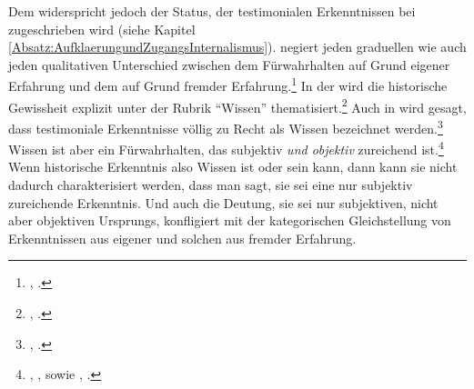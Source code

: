 Dem widerspricht jedoch der Status, der testimonialen Erkenntnissen bei
 zugeschrieben wird (siehe Kapitel
\ref{Absatz:AufklaerungundZugangsInternalismus}). 
negiert jeden graduellen wie auch jeden qualitativen Unterschied zwischen dem
Fürwahrhalten auf Grund eigener Erfahrung und dem auf Grund fremder
Erfahrung.\footnote{\cite[Vgl.][A 103]{Kant:ImmanuelKantsLogik1977}, \cite[][IX:
69.2--4]{Kant:GesammelteWerke1900ff.}.} In der 
wird die historische Gewissheit explizit unter der Rubrik \enquote{Wissen}
thematisiert.\footnote{\cite[Vgl.][A 108]{Kant:ImmanuelKantsLogik1977},
\cite[][IX: 71.6--7]{Kant:GesammelteWerke1900ff.}.} Auch in  wird gesagt, dass testimoniale Erkenntnisse völlig
zu Recht als Wissen bezeichnet werden.\footnote{\cite[Vgl.][A
319]{Kant:Washeisst:SichimDenkenorientieren?1977},
\cite[][VIII: 141.10--17]{Kant:GesammelteWerke1900ff.}.} Wissen ist aber ein
Fürwahrhalten, das subjektiv \emph{und objektiv} zureichend
ist.\footnote{\cite[Vgl.][B 850]{Kant:KritikderreinenVernunft2003},
\cite[][III: 533.4--5]{Kant:GesammelteWerke1900ff.}, sowie
\cite[][A 107]{Kant:ImmanuelKantsLogik1977},
\cite[][IX: 70.27--31]{Kant:GesammelteWerke1900ff.}.} Wenn historische
Erkenntnis also Wissen ist oder sein kann, dann kann sie nicht dadurch
charakterisiert werden, dass man sagt, sie sei eine nur subjektiv zureichende
Erkenntnis. Und auch die Deutung, sie sei nur subjektiven, nicht aber objektiven
Ursprungs, konfligiert mit der kategorischen Gleichstellung von Erkenntnissen
aus eigener und solchen aus fremder Erfahrung.


